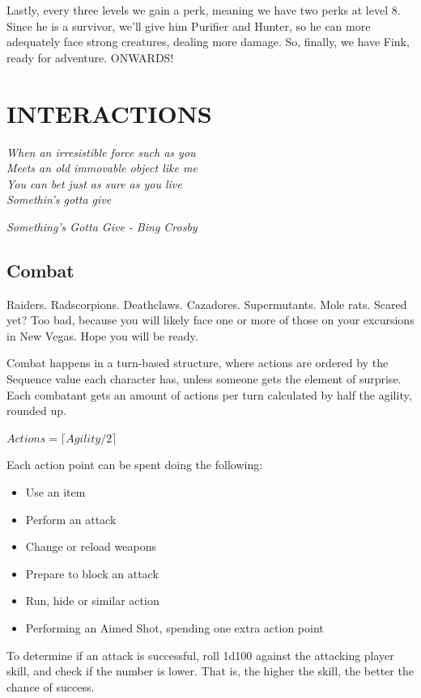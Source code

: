 \documentclass[11pt]{article} %
\begin{document}
Lastly, every three levels we gain a perk, meaning we have two perks at level 8. Since he is a survivor, we'll give him Purifier and Hunter, so he can more adequately face strong creatures, dealing more damage. So, finally, we have Fink, ready for adventure. ONWARDS!


\newpage


\section{INTERACTIONS}

\epigraph{\textit{When an irresistible force such as you \\
Meets an old immovable object like me \\
You can bet just as sure as you live \\
Somethin's gotta give}}{\textit{Something's Gotta Give - Bing Crosby}}

\subsection{Combat}

Raiders. Radscorpions. Deathclaws. Cazadores. Supermutants. Mole rats. Scared yet? Too bad, because you will likely face one or more of those on your excursions in New Vegas. Hope you will be ready.

Combat happens in a turn-based structure, where actions are ordered by the Sequence value each character has, unless someone gets the element of surprise. Each combatant gets an amount of actions per turn calculated by half the agility, rounded up.

\begin{center}
	$Actions = \lceil Agility / 2 \rceil$
\end{center}

Each action point can be spent doing the following:

\begin{itemize}
	\item Use an item
	\item Perform an attack
	\item Change or reload weapons
	\item Prepare to block an attack
	\item Run, hide or similar action
	\item Performing an Aimed Shot, spending one extra action point
\end{itemize}

To determine if an attack is successful, roll 1d100 against the attacking player skill, and check if the number is lower. That is, the higher the skill, the better the chance of success.
\end{document}
